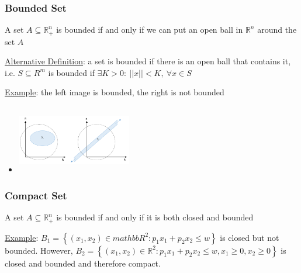 \documentclass{article}
\begin{document}
\subsubsection{Bounded Set}
A set $A \subseteq \mathbb{R}_{+}^{n}$ is bounded if and only if we can put an open ball in $\mathbb{R}^{n}$ around the set $A$ \par \vspace{0.3em}
  \underline{Alternative Definition}: a set is bounded if there is an open ball that contains it, i.e. $S \subseteq R^{m}$ is bounded if $\exists K > 0: \ ||x|| < K, \ \forall x \in S $ \par
  \underline{Example}: the left image is bounded, the right is not bounded
  \begin{itemize}
    \item  \includegraphics[width=5cm, height=3cm]{pic5}
  \end{itemize}
  \par
\vspace{6mm}
\subsubsection{Compact Set}
A set $A \subseteq \mathbb{R}_{+}^{n}$ is bounded if and only if it is both closed and bounded \par \vspace{0.3em}
  \underline{Example}: $B_{1} = \left\{ (x_{1},x_{2}) \in mathbb{R}^{2}: p_{1}x_{1} + p_{2}x_{2} \leq w \right\}$ is closed but not bounded. However, $B_{2} = \left\{ (x_{1},x_{2}) \in \mathbb{R}^{2}: p_{1}x_{1} + p_{2}x_{2} \leq w, x_{1} \geq 0, x_{2} \geq 0 \right\}$ is closed and bounded and therefore compact.
  \par
\vspace{6mm}
\end{document}
